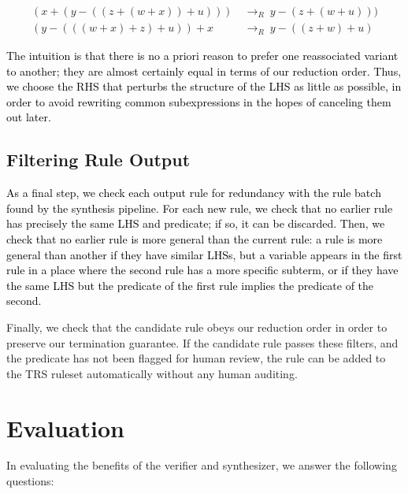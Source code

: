 \documentclass[acmsmall,review]{acmart}\settopmatter{printfolios=true,printccs=false,printacmref=false}
\newcommand{\modified}[1]{\textcolor{black}{{#1}}}
\newcommand{\rewrites}[0]{\:\rightarrow_{R}\:}
\begin{document}
\begin{equation*}
\begin{split}
(x + (y - ((z + (w + x)) + u))) & \rewrites y - (z + (w + u))) \\
(y - (((w + x) + z) + u)) + x & \rewrites y - ((z + w) + u)
\end{split}
\end{equation*}

\modified{The intuition is that there is no a priori reason 
to prefer one reassociated variant to another; they are almost certainly equal in 
terms of our reduction order. Thus, we choose the RHS that perturbs the structure of the 
LHS as little as possible, in order to avoid rewriting common subexpressions in the hopes
of canceling them out later.}


\subsection{Filtering Rule Output}
\label{sec:filtering}
\modified{As a final step, we check each output rule for redundancy with the rule batch found
by the synthesis pipeline. For each new rule, we check
that no earlier rule has precisely the same LHS and predicate; if so, it can be discarded.
Then, we check that no earlier rule is more general than the current rule: a rule is more 
general than another if they have similar LHSs, but a variable appears in the first rule 
in a place where the second rule has a more specific subterm, or if they have the same LHS
but the predicate of the first rule implies the predicate of the second.}

Finally, we
check that the candidate rule obeys our reduction order in order to
preserve our termination guarantee. If the candidate rule passes these
filters, and the predicate has not been flagged for human review, the
rule can be added to the TRS ruleset automatically without any human
auditing.

\section{Evaluation}
\label{sec:evaluation}

\newcommand{\PercentPossibleToSynth}{69\%}
\newcommand{\NumRulesInCorrectnessExperiment}{321}
\newcommand{\PercentRulesResynthesized}{58\%}

In evaluating the benefits of the verifier and synthesizer, we answer the following questions:
\end{document}
